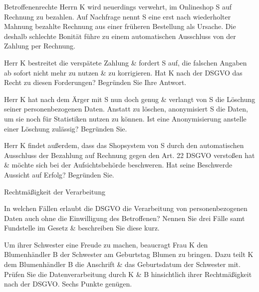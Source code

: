 \documentclass{exercisesheet}
\begin{document}


\begin{exercise*}{Betroffenenrechte}{
    Herrn K wird neuerdings verwehrt, im Onlineshop S auf Rechnung zu bezahlen. Auf Nachfrage nennt S eine erst nach wiederholter Mahnung bezahlte Rechnung aus einer früheren Bestellung als Ursache. Die deshalb schlechte Bonität führe zu einem automatischen Ausschluss von der Zahlung per Rechnung.
  }
  \item Herr K bestreitet die verspätete Zahlung \& fordert S auf, die falschen Angaben ab sofort nicht mehr zu nutzen \& zu korrigieren. Hat K nach der DSGVO das Recht zu diesen Forderungen? Begründen Sie Ihre Antwort.
  \item Herr K hat nach dem Ärger mit S nun doch genug \& verlangt von S die Löschung seiner personenbezogenen Daten. Anstatt zu löschen, anonymisiert S die Daten, um sie noch für Statistiken nutzen zu können. Ist eine Anonymisierung anstelle einer Löschung zulässig? Begründen Sie.
  \item Herr K findet außerdem, dass das Shopsystem von S durch den automatischen Ausschluss der Bezahlung auf Rechnung gegen den Art. 22 DSGVO verstoßen hat \& möchte sich bei der Aufsichtsbehörde beschweren. Hat seine Beschwerde Aussicht auf Erfolg? Begründen Sie.
\end{exercise*}

\begin{exercise**}{Rechtmäßigkeit der Verarbeitung}
  \item In welchen Fällen erlaubt die DSGVO die Verarbeitung von personenbezogenen Daten auch ohne die Einwilligung des Betroffenen? Nennen Sie drei Fälle samt Fundstelle im Gesetz \& beschreiben Sie diese kurz.
  \item Um ihrer Schwester eine Freude zu machen, beaucragt Frau K den Blumenhändler B der Schwester am Geburtstag Blumen zu bringen. Dazu teilt K dem Blumenhändler B die Anschrift \& das Geburtsdatum der Schwester mit. Prüfen Sie die Datenverarbeitung durch K \& B hinsichtlich ihrer Rechtmäßigkeit nach der DSGVO. Sechs Punkte genügen.
\end{exercise**}
\end{document}
